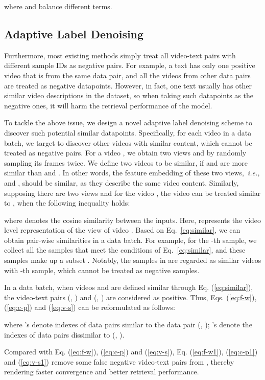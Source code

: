 \documentclass{article}
\begin{document}
where  and  balance different terms.



\subsection{Adaptive Label Denoising}
Furthermore, most existing methods simply treat all video-text pairs with different sample IDs as negative pairs.
For example, a text has only one positive video that is from the same data pair, and all the videos from other data pairs are treated as negative datapoints.
However, in fact, one text usually has other similar video descriptions in the dataset, so when taking such datapoints as the negative ones, it will harm the retrieval performance of the model.

To tackle the above issue, we design a novel adaptive label denoising scheme to discover such potential similar datapoints. 
Specifically, for each video in a data batch, we target to discover other videos with similar content, which cannot be treated as negative pairs.
For a video , we obtain two views  and  by randomly sampling its frames twice. 
We define two videos to be similar, if  and  are more similar than  and .
In other words, the feature embedding of these two views,~\emph{i.e.,}  and , should be similar, as they describe the same video content.
Similarly, supposing there are two views  and  for the video , the video  can be treated similar to , when the following inequality holds:
 
where  denotes the cosine similarity between the inputs.
Here,  represents the video level representation of the  view of video .
Based on Eq.~\eqref{eq:similar}, we can obtain pair-wise similarities in a data batch. For example, for the -th sample, we collect all the samples that meet the conditions of Eq.~\eqref{eq:similar}, and these samples make up a subset . Notably, the samples in  are regarded as similar videos with -th sample, which cannot be treated as negative samples.
 
 In a data batch, when videos  and  are defined similar through Eq. (\ref{eq:similar}), the video-text pairs (,  ) and (,  ) are considered as positive.
 Thus, Eqs. (\ref{eq:f-w}), (\ref{eq:c-p}) and (\ref{eq:v-s}) can be reformulated as follows:
 
 
 
 
where 's denote indexes of data pairs similar to the data pair (, ); 's denote the indexes of data pairs dissimilar to (, ).

Compared with Eq. (\ref{eq:f-w}), (\ref{eq:c-p}) and (\ref{eq:v-s}), Eq. (\ref{eq:f-w1}), (\ref{eq:c-p1}) and (\ref{eq:v-s1}) remove some false negative video-text pairs from , thereby rendering faster convergence and better retrieval performance. 
\end{document}
